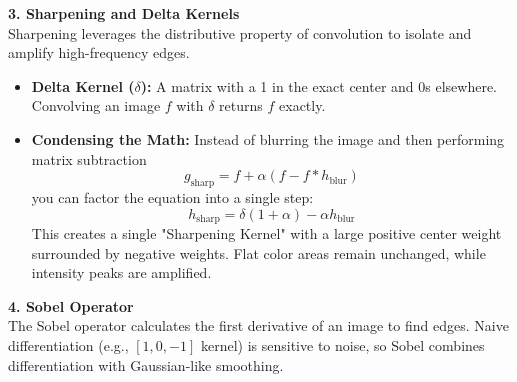 \documentclass[12pt]{article}
\begin{document}
\textbf{3. Sharpening and Delta Kernels} \\
Sharpening leverages the distributive property of convolution to isolate and amplify high-frequency edges.

\begin{itemize}
    \item \textbf{Delta Kernel ($\delta$):} A matrix with a 1 in the exact center and 0s elsewhere. Convolving an image $f$ with $\delta$ returns $f$ exactly.
    \item \textbf{Condensing the Math:} Instead of blurring the image and then performing matrix subtraction
          \[
              g_\text{sharp} = f + \alpha(f - f * h_\text{blur})
          \]
          you can factor the equation into a single step:
          \[
              h_\text{sharp} = \delta(1+\alpha) - \alpha h_\text{blur}
          \]
          This creates a single "Sharpening Kernel" with a large positive center weight surrounded by negative weights. Flat color areas remain unchanged, while intensity peaks are amplified.
\end{itemize}

\textbf{4. Sobel Operator} \\
The Sobel operator calculates the first derivative of an image to find edges. Naive differentiation (e.g., $[1,0,-1]$ kernel) is sensitive to noise, so Sobel combines differentiation with Gaussian-like smoothing.
\end{document}

